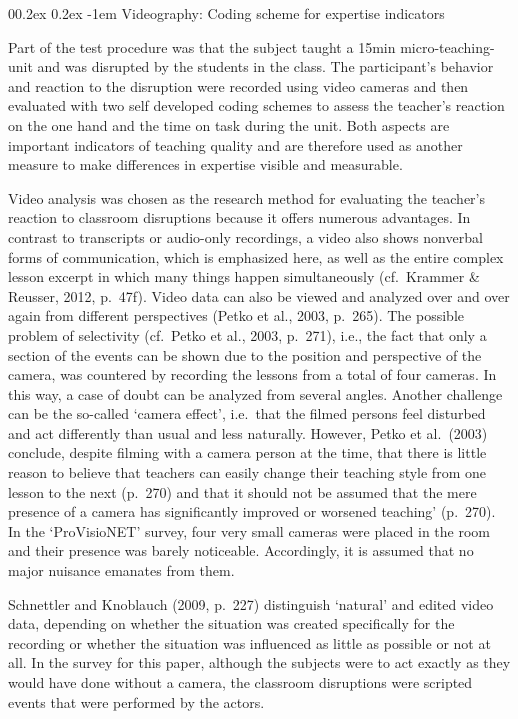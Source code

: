 \documentclass[
  man]{apa6}
\makeatletter
\let\oldparagraph\paragraph
\renewcommand{\paragraph}{
    \@ifstar
      \xxxParagraphStar
      \xxxParagraphNoStar
  }
\newcommand{\xxxParagraphStar}[1]{\oldparagraph*{#1}\mbox{}}
\newcommand{\xxxParagraphNoStar}[1]{\oldparagraph{#1}\mbox{}}
\renewcommand{\paragraph}{\@startsection{paragraph}{4}{\parindent}%
  {0\baselineskip \@plus 0.2ex \@minus 0.2ex}%
  {-1em}%
  {\normalfont\normalsize\bfseries\itshape\typesectitle}}
\makeatother
\begin{document}
\paragraph{Videography: Coding scheme for expertise indicators}\label{videography-coding-scheme-for-expertise-indicators}

Part of the test procedure was that the subject taught a 15min micro-teaching-unit and was disrupted by the students in the class. The participant's behavior and reaction to the disruption were recorded using video cameras and then evaluated with two self developed coding schemes to assess the teacher's reaction on the one hand and the time on task during the unit. Both aspects are important indicators of teaching quality and are therefore used as another measure to make differences in expertise visible and measurable.

Video analysis was chosen as the research method for evaluating the teacher's reaction to classroom disruptions because it offers numerous advantages. In contrast to transcripts or audio-only recordings, a video also shows nonverbal forms of communication, which is emphasized here, as well as the entire complex lesson excerpt in which many things happen simultaneously (cf.~Krammer \& Reusser, 2012, p.~47f). Video data can also be viewed and analyzed over and over again from different perspectives (Petko et al., 2003, p.~265). The possible problem of selectivity (cf.~Petko et al., 2003, p.~271), i.e., the fact that only a section of the events can be shown due to the position and perspective of the camera, was countered by recording the lessons from a total of four cameras. In this way, a case of doubt can be analyzed from several angles. Another challenge can be the so-called `camera effect', i.e.~that the filmed persons feel disturbed and act differently than usual and less naturally. However, Petko et al.~(2003) conclude, despite filming with a camera person at the time, that there is little reason to believe that teachers can easily change their teaching style from one lesson to the next (p.~270) and that it should not be assumed that the mere presence of a camera has significantly improved or worsened teaching' (p.~270). In the `ProVisioNET' survey, four very small cameras were placed in the room and their presence was barely noticeable. Accordingly, it is assumed that no major nuisance emanates from them.

Schnettler and Knoblauch (2009, p.~227) distinguish `natural' and edited video data, depending on whether the situation was created specifically for the recording or whether the situation was influenced as little as possible or not at all. In the survey for this paper, although the subjects were to act exactly as they would have done without a camera, the classroom disruptions were scripted events that were performed by the actors.
\end{document}
